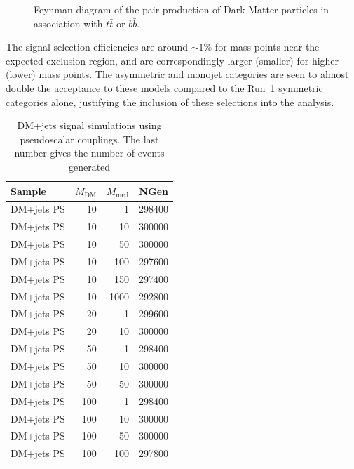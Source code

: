 \begin{figure}[h!] \centering
  \caption{Feynman diagram of the pair production of Dark Matter particles in
  association with $t\bar{t}$ or $b\bar{b}$. \cite{Abercrombie:2015wmb}}
  \label{fig:feynman_hf}
\end{figure}

The signal selection efficiencies are around $\sim 1$\% for mass points near the expected exclusion
region, and are correspondingly larger (smaller) for higher (lower) mass points.
The asymmetric and monojet categories are seen to almost double the acceptance
to these models compared to the Run~1 symmetric categories alone, justifying the
inclusion of these selections into the analysis.

\begin{table}[]
\centering
\begin{tabular}{lrrr}
\hline \hline
Sample & $M_{\text{DM}}$ & $M_{\text{med}}$ & NGen \\
\hline  
DM+jets PS &  10 &    1 & 298400 \\
DM+jets PS &  10 &   10 & 300000 \\
DM+jets PS &  10 &   50 & 300000 \\
DM+jets PS &  10 &  100 & 297600 \\
DM+jets PS &  10 &  150 & 297400 \\
DM+jets PS &  10 & 1000 & 292800 \\
DM+jets PS &  20 &    1 & 299600 \\
DM+jets PS &  20 &   10 & 300000 \\
DM+jets PS &  50 &    1 & 298400 \\
DM+jets PS &  50 &   10 & 300000 \\
DM+jets PS &  50 &   50 & 300000 \\
DM+jets PS & 100 &    1 & 298400 \\
DM+jets PS & 100 &   10 & 300000 \\
DM+jets PS & 100 &   50 & 300000 \\
DM+jets PS & 100 &  100 & 297800 \\
\hline \hline
\end{tabular}
\caption{DM+jets signal simulations using pseudoscalar couplings. The last number gives the number of events generated}
\label{tab:dmj_ps}
\end{table}

